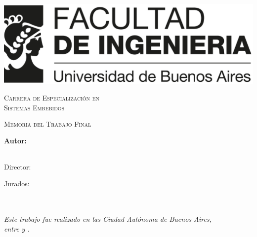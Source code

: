 \documentclass[
11pt, %
spanish,
singlespacing, %
parskip, %
headsepline, %
]{MastersDoctoralThesis} %
\author{Nombre del Autor} %
\begin{document}
\frontmatter %

\pagestyle{plain} %


\begin{titlepage}
\begin{center}


\includegraphics[width=.8\textwidth]{./Figures/logoFIUBA.png}
\vspace{2cm}

\textsc{\huge{Carrera de Especialización en\\ \vspace{5px} Sistemas Embebidos}}
\vspace{.5cm} %

\textsc{\Large Memoria del Trabajo Final}\\[1cm] %
{\huge \bfseries \ttitle\par}\vspace{0.4cm} %

\vfill

\vspace{2cm}
\LARGE\textbf{Autor:\\
\authorname}\\ %

\vspace{1.5cm}

\large
{Director:} \\
{\supname} %
 
\vspace{1cm}
Jurados:\\	
\jurunoname\\
\jurdosname\\
\jurtresname

\vspace{2cm}

\textit{Este trabajo fue realizado en las Ciudad Autónoma de Buenos Aires,\\ entre \fechaINICIOname \hspace{1px} y \fechaFINALname.}
\end{center}
\end{titlepage}
\end{document}
